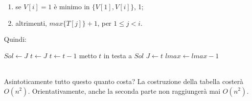 \begin{enumerate}
	\item se $V[i]=1$ è minimo in $\{V[1], V[i]\}$, 1;
	\item altrimenti, $max\{T[j]\}+1$, per $1\leq j < i$.
\end{enumerate}
Quindi:
\begin{algorithm}
	\label{alg:subDIVpt2-2}
	\begin{algorithmic}
			\State $Sol \gets J$
				\State $t \gets J$
					\State $t \gets t-1$
				\EndWhile
				\State metto $t$ in testa a $Sol$
				\State $J \gets t$
				\State $lmax \gets lmax-1$
			\EndWhile
		\EndFunction
	\end{algorithmic}
\end{algorithm} \hfill \\
Asintoticamente tutto questo quanto costa? La costruzione della tabella costerà $O(n^2)$. Orientativamente, anche la seconda parte non raggiungerà mai $O(n^2)$.


